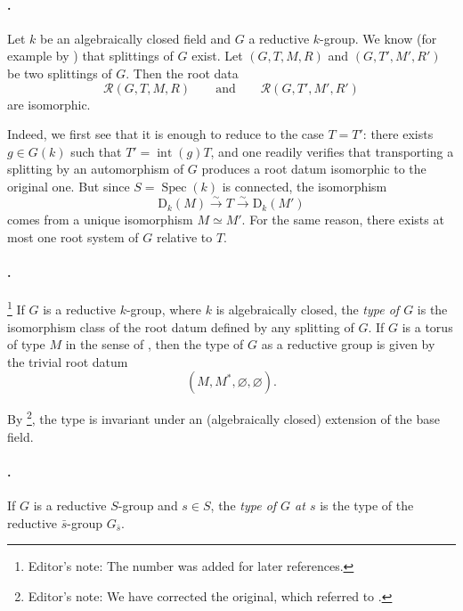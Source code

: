 \paragraph{.}
Let \(k\) be an algebraically closed field and \(G\) a reductive
\(k\)-group. We know \textup{(for example by )} that splittings of
\(G\) exist. Let \((G,T,M,R)\) and \((G,T',M',R')\) be two splittings
of \(G\). Then the root data
\[
  \mathcal R(G,T,M,R)
  \qquad\text{and}\qquad
  \mathcal R(G,T',M',R')
\]
are isomorphic.

Indeed, we first see that it is enough to reduce to the case
\(T=T'\): there exists \(g\in G(k)\) such that
\(T'=\operatorname{int}(g)T\), and one readily verifies that
transporting a splitting by an automorphism of \(G\) produces a root
datum isomorphic to the original one. But since
\(S=\operatorname{Spec}(k)\) is connected, the isomorphism
\[
  \mathrm D_k(M)\xrightarrow{\sim}T
  \xrightarrow{\sim}\mathrm D_k(M')
\]
comes from a unique isomorphism \(M\simeq M'\). For the same reason,
there exists at most one root system of \(G\) relative to \(T\).

\paragraph{.}
\footnote{Editor's note: The number  was added for later
references.}
If \(G\) is a reductive \(k\)-group, where \(k\) is algebraically
closed, the \emph{type of \(G\)} is the isomorphism class of the root
datum defined by any splitting of \(G\). If \(G\) is a torus of type
\(M\) in the sense of , then the type of \(G\) as a
reductive group is given by the trivial root datum
\[
  (M,M^*,\varnothing,\varnothing).
\]

By \footnote{Editor's note: We have corrected the original,
which referred to .}, the type is invariant under an
\textup{(algebraically closed)} extension of the base field.

\paragraph{.}
If \(G\) is a reductive \(S\)-group and \(s\in S\), the \emph{type of
\(G\) at \(s\)} is the type of the reductive
\(\bar s\)-group \(G_{\bar s}\).

